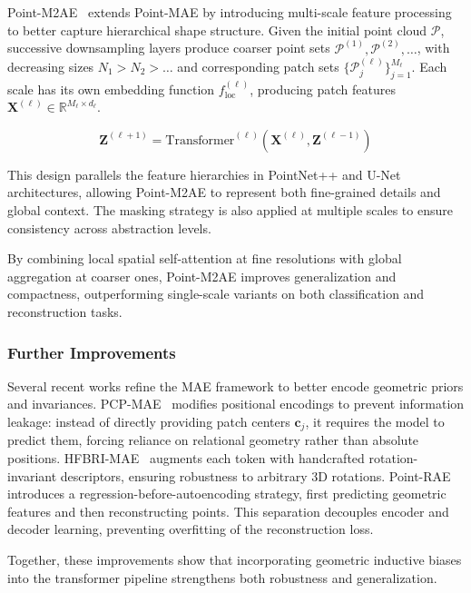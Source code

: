 Point-M2AE~\cite{pm2ae} extends Point-MAE by introducing multi-scale feature processing to better capture hierarchical shape structure. Given the initial point cloud $\mathcal{P}$, successive downsampling layers produce coarser point sets $\mathcal{P}^{(1)}, \mathcal{P}^{(2)}, \dots$, with decreasing sizes $N_1 > N_2 > \dots$ and corresponding patch sets $\{ \mathcal{P}^{(\ell)}_j \}_{j=1}^{M_\ell}$. Each scale has its own embedding function $f_{\text{loc}}^{(\ell)}$, producing patch features $\mathbf{X}^{(\ell)} \in \mathbb{R}^{M_\ell \times d_\ell}$.

\begin{equation}
  \mathbf{Z}^{(\ell+1)} = \text{Transformer}^{(\ell)}(\mathbf{X}^{(\ell)},\mathbf{Z}^{(\ell-1)})
\end{equation}

This design parallels the feature hierarchies in PointNet++ and U-Net architectures, allowing Point-M2AE to represent both fine-grained details and global context. The masking strategy is also applied at multiple scales to ensure consistency across abstraction levels.

By combining local spatial self-attention at fine resolutions with global aggregation at coarser ones, Point-M2AE improves generalization and compactness, outperforming single-scale variants on both classification and reconstruction tasks.

\subsubsection{Further Improvements}
\label{sssec:further_improvements}

Several recent works refine the MAE framework to better encode geometric priors and invariances.
PCP-MAE~\cite{pcpmae} modifies positional encodings to prevent information leakage: instead of directly providing patch centers $\mathbf{c}_j$, it requires the model to predict them, forcing reliance on relational geometry rather than absolute positions.
HFBRI-MAE~\cite{hfbrimae} augments each token with handcrafted rotation-invariant descriptors, ensuring robustness to arbitrary 3D rotations.
Point-RAE~\cite{prae} introduces a regression-before-autoencoding strategy, first predicting geometric features and then reconstructing points. This separation decouples encoder and decoder learning, preventing overfitting of the reconstruction loss.

Together, these improvements show that incorporating geometric inductive biases into the transformer pipeline strengthens both robustness and generalization.

